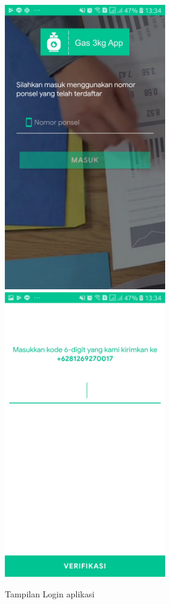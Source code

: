	\vspace{-0.2cm}
	\begin{figure}[H]
		\center
		\includegraphics [width = 7cm]{gambar/android/login}
		\vspace{1cm}
		\includegraphics [width = 7cm]{gambar/android/verify}
		\caption{Tampilan Login aplikasi}
		\label{tampilanLoginPangkalan}
	\end{figure}
	
